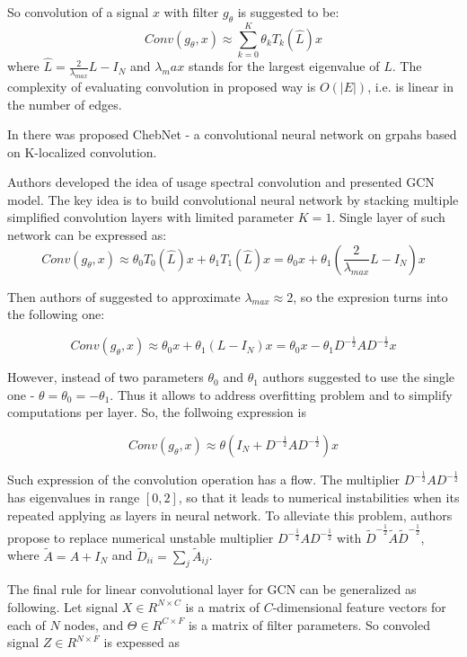 So convolution of a signal $x$ with filter $g_\theta$ is suggested to be:
\[
    Conv(g_\theta,x) \approx \sum_{k=0}^{K}{\theta}_k T_k(\hat{L})x
\]
where
$\hat{L} = \frac{2}{\lambda_{max}}L-I_N$ and $\lambda_max$ stands for the largest eigenvalue of $L$.
The complexity of evaluating convolution in proposed way is $O(|E|)$, i.e. is linear in the number of edges.

In \cite{ChebNet} there was proposed ChebNet - a convolutional neural network on grpahs based on K-localized convolution.

Authors \cite{GCN} developed the idea of usage spectral convolution and presented GCN model. The key idea is to build
convolutional neural network by stacking multiple simplified convolution layers with limited parameter $K=1$.
Single layer of such network can be expressed as: 
\[
    Conv(g_\theta,x) \approx {\theta}_0 T_0(\hat{L})x + {\theta}_1 T_1(\hat{L})x = {\theta}_0 x + {\theta}_1 (\frac{2}{\lambda_{max}}L-I_N)x
\]

Then authors of \cite{GCN} suggested to approximate $\lambda_{max} \approx 2$, so the expresion turns into the following one:

\[
    Conv(g_\theta,x) \approx {\theta}_0 x + {\theta}_1 (L-I_N)x = {\theta}_0 x - {\theta}_1 D^{-\frac{1}{2}}AD^{-\frac{1}{2}}x
\]

However, instead of two parameters $\theta_0$ and $\theta_1$ authors suggested to use the single one - $\theta = \theta_0 = -\theta_1$. Thus it allows to
address overfitting problem and to simplify computations per layer. So, the follwoing expression is

\[
    Conv(g_\theta,x) \approx {\theta}(I_N + D^{-\frac{1}{2}}AD^{-\frac{1}{2}})x
\]

Such expression of the convolution operation has a flow. The multiplier  $D^{-\frac{1}{2}}AD^{-\frac{1}{2}}$ has eigenvalues in 
range $[0,2]$, so that it leads to numerical instabilities when its repeated applying as layers in neural network. To alleviate this
problem, authors propose to replace numerical unstable multiplier $D^{-\frac{1}{2}}AD^{-\frac{1}{2}}$
with $\tilde{D}^{-\frac{1}{2}}\tilde{A}\tilde{D}^{-\frac{1}{2}}$, where $\tilde{A}=A+I_N$ and $\tilde{D}_{ii}=\sum_{j}\tilde{A}_{ij}$.

The final rule for linear convolutional layer for GCN can be generalized as following. Let signal $X \in R^{N\times C}$ is a matrix of $C$-dimensional
feature vectors for each of $N$ nodes, and $\Theta \in R^{C \times F}$ is a matrix of filter parameters. So convoled signal $Z \in R^{N \times F}$ is 
expessed as 

